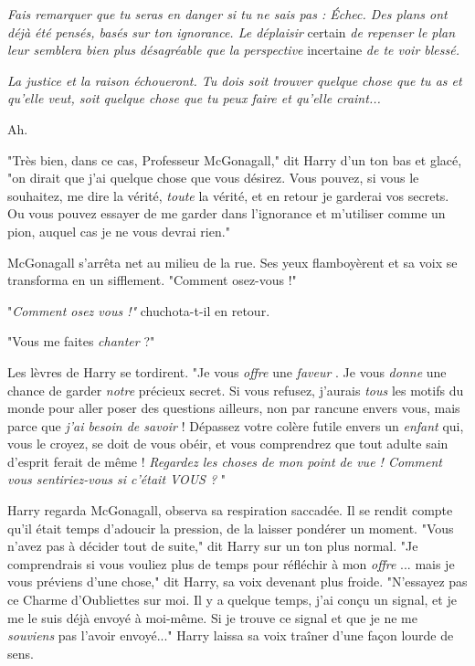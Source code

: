 \emph{Fais remarquer que tu seras en danger si tu ne sais pas : Échec. Des plans ont déjà été pensés, basés sur ton ignorance. Le déplaisir } certain\emph{ de repenser le plan leur semblera bien plus désagréable que la perspective } incertaine\emph{ de te voir blessé.} 

\emph{La justice et la raison échoueront. Tu dois soit trouver quelque chose que tu as et qu'elle veut, soit quelque chose que tu peux faire et qu'elle craint...} 

Ah.

"Très bien, dans ce cas, Professeur McGonagall," dit Harry d'un ton bas et glacé, "on dirait que j'ai quelque chose que vous désirez. Vous pouvez, si vous le souhaitez, me dire la vérité, \emph{toute}  la vérité, et en retour je garderai vos secrets. Ou vous pouvez essayer de me garder dans l'ignorance et m'utiliser comme un pion, auquel cas je ne vous devrai rien."

McGonagall s'arrêta net au milieu de la rue. Ses yeux flamboyèrent et sa voix se transforma en un sifflement. "Comment osez-vous !"

"\emph{Comment osez vous !"}  chuchota-t-il en retour.

"Vous me faites \emph{chanter}  ?"

Les lèvres de Harry se tordirent. "Je vous \emph{offre}  une \emph{faveur} . Je vous \emph{donne}  une chance de garder \emph{notre}  précieux secret. Si vous refusez, j'aurais \emph{tous}  les motifs du monde pour aller poser des questions ailleurs, non par rancune envers vous, mais parce que \emph{j'ai besoin de savoir}  ! Dépassez votre colère futile envers un \emph{enfant}  qui, vous le croyez, se doit de vous obéir, et vous comprendrez que tout adulte sain d'esprit ferait de même ! \emph{Regardez les choses de mon point de vue ! Comment vous sentiriez-vous si c'était VOUS ?} "

Harry regarda McGonagall, observa sa respiration saccadée. Il se rendit compte qu'il était temps d'adoucir la pression, de la laisser pondérer un moment. "Vous n'avez pas à décider tout de suite," dit Harry sur un ton plus normal. "Je comprendrais si vous vouliez plus de temps pour réfléchir à mon \emph{offre} ... mais je vous préviens d'une chose," dit Harry, sa voix devenant plus froide. "N'essayez pas ce Charme d'Oubliettes sur moi. Il y a quelque temps, j'ai conçu un signal, et je me le suis déjà envoyé à moi-même. Si je trouve ce signal et que je ne me \emph{souviens}  pas l'avoir envoyé..." Harry laissa sa voix traîner d'une façon lourde de sens.

